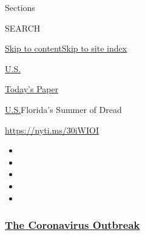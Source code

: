 Sections

SEARCH

\protect\hyperlink{site-content}{Skip to
content}\protect\hyperlink{site-index}{Skip to site index}

\href{https://www.nytimes3xbfgragh.onion/section/us}{U.S.}

\href{https://myaccount.nytimes3xbfgragh.onion/auth/login?response_type=cookie\&client_id=vi}{}

\href{https://www.nytimes3xbfgragh.onion/section/todayspaper}{Today's
Paper}

\href{/section/us}{U.S.}\textbar{}Florida's Summer of Dread

\url{https://nyti.ms/30iWIOI}

\begin{itemize}
\item
\item
\item
\item
\item
\end{itemize}

\hypertarget{the-coronavirus-outbreak}{%
\subsubsection{\texorpdfstring{\href{https://www.nytimes3xbfgragh.onion/news-event/coronavirus?name=styln-coronavirus-national\&region=TOP_BANNER\&variant=undefined\&block=storyline_menu_recirc\&action=click\&pgtype=Article\&impression_id=a1a3f0a0-e386-11ea-afce-73cba6f30df3}{The
Coronavirus
Outbreak}}{The Coronavirus Outbreak}}\label{the-coronavirus-outbreak}}

